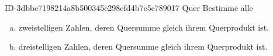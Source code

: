 \begin{exercise}
      {ID-3dbbe7198214a8b500345e298cfd4b7c5e789017}
      {Quer}
  \ifproblem\problem
    Bestimme alle
    \begin{enumerate}[a)]
      \item zweistelligen Zahlen, deren Quersumme gleich ihrem Querprodukt ist.
      \item dreistelligen Zahlen, deren Quersumme gleich ihrem Querprodukt ist.
    \end{enumerate}
  \fi
\end{exercise}
